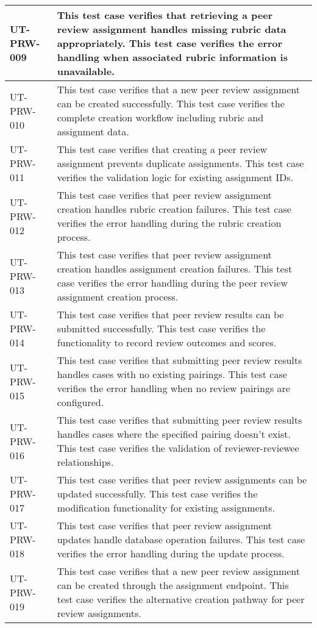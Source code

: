 \begin{longtable}{|p{}|p{}|}
\hline
UT-PRW-009 & This test case verifies that retrieving a peer review assignment handles missing rubric data appropriately. This test case verifies the error handling when associated rubric information is unavailable. \\
\hline
UT-PRW-010 & This test case verifies that a new peer review assignment can be created successfully. This test case verifies the complete creation workflow including rubric and assignment data. \\
\hline
UT-PRW-011 & This test case verifies that creating a peer review assignment prevents duplicate assignments. This test case verifies the validation logic for existing assignment IDs. \\
\hline
UT-PRW-012 & This test case verifies that peer review assignment creation handles rubric creation failures. This test case verifies the error handling during the rubric creation process. \\
\hline
UT-PRW-013 & This test case verifies that peer review assignment creation handles assignment creation failures. This test case verifies the error handling during the peer review assignment creation process. \\
\hline
UT-PRW-014 & This test case verifies that peer review results can be submitted successfully. This test case verifies the functionality to record review outcomes and scores. \\
\hline
UT-PRW-015 & This test case verifies that submitting peer review results handles cases with no existing pairings. This test case verifies the error handling when no review pairings are configured. \\
\hline
UT-PRW-016 & This test case verifies that submitting peer review results handles cases where the specified pairing doesn't exist. This test case verifies the validation of reviewer-reviewee relationships. \\
\hline
UT-PRW-017 & This test case verifies that peer review assignments can be updated successfully. This test case verifies the modification functionality for existing assignments. \\
\hline
UT-PRW-018 & This test case verifies that peer review assignment updates handle database operation failures. This test case verifies the error handling during the update process. \\
\hline
UT-PRW-019 & This test case verifies that a new peer review assignment can be created through the assignment endpoint. This test case verifies the alternative creation pathway for peer review assignments. \\
\hline
\end{longtable}

